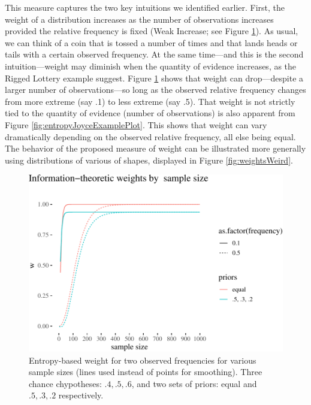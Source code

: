 \documentclass[
  10pt,
  dvipsnames,enabledeprecatedfontcommands]{scrartcl}
\begin{document}
This measure captures the two key intuitions we identified earlier.
First, the weight of a distribution increases as the number of
observations increases provided the relative frequency is fixed (Weak
Increase; see Figure \ref{fig:entropyJoyceExampleSampleSize}). As usual,
we can think of a coin that is tossed a number of times and that lands
heads or tails with a certain observed frequency. At the same time---and
this is the second intuition---weight may diminish when the quantity of
evidence increases, as the Rigged Lottery example suggest. Figure
\ref{fig:entropyJoyceExampleSampleSize} shows that weight can
drop---despite a larger number of observations---so long as the observed
relative frequency changes from more extreme (say .1) to less extreme
(say .5). That weight is not strictly tied to the quantity of evidence
(number of observations) is also apparent from Figure
\ref{fig:entropyJoyceExamplePlot}. This shows that weight can vary
dramatically depending on the observed relative frequency, all else
being equal. The behavior of the proposed measure of weight can be
illustrated more generally using distributions of various of shapes,
displayed in Figure \ref{fig:weightsWeird}.

\begin{figure}

\begin{center}\includegraphics[width=0.7\linewidth]{chapter-outline_files/figure-latex/entropyJoyceExampleSampleSize-1} \end{center}

\caption{Entropy-based weight for two observed frequencies for various sample sizes (lines used instead of points for smoothing). Three chance chypotheses: $.4, .5, .6$, and two sets of priors: equal and $.5, .3, .2$ respectively.}
\label{fig:entropyJoyceExampleSampleSize}
\end{figure}
\end{document}
